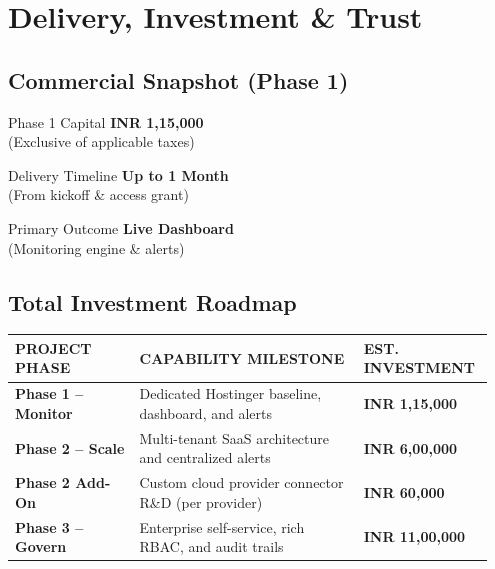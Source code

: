 \documentclass[11pt,a4paper]{article}
\newcommand{\thd}[1]{\textsc{\bfseries\color{white}\fontsize{8.6}{8.6}\selectfont #1}}
\begin{document}
\section{Delivery, Investment \& Trust}

\subsection{Commercial Snapshot (Phase 1)}
\vspace{0.5em}
\begin{center}
\begin{valuecard}{Phase 1 Capital}
\textbf{INR 1,15,000}\\[4pt]
\textcolor{softgray}{\fontsize{8}{10}\selectfont (Exclusive of applicable taxes)}
\end{valuecard}
\hfill
\begin{valuecard}{Delivery Timeline}
\textbf{Up to 1 Month}\\[4pt]
\textcolor{softgray}{\fontsize{8}{10}\selectfont (From kickoff \& access grant)}
\end{valuecard}
\hfill
\begin{valuecard}{Primary Outcome}
\textbf{Live Dashboard}\\[4pt]
\textcolor{softgray}{\fontsize{8}{10}\selectfont (Monitoring engine \& alerts)}
\end{valuecard}
\end{center}
\vspace{1.5em}

\subsection{Total Investment Roadmap}
\vspace{0.5em}
\renewcommand{\arraystretch}{1.7}
\begin{tabular}{@{}>{\raggedright\arraybackslash}p{0.25\linewidth}>{\raggedright\arraybackslash}p{0.45\linewidth}>{\raggedleft\arraybackslash}p{0.25\linewidth}@{}}
\rowcolor{navy}
\thd{PROJECT PHASE} & \thd{CAPABILITY MILESTONE} & \thd{EST. INVESTMENT} \\
\midrule
\textbf{Phase 1 -- Monitor} & Dedicated Hostinger baseline, dashboard, and alerts & \textbf{INR 1,15,000} \\
\rowcolor{tabletint}
\textbf{Phase 2 -- Scale} & Multi-tenant SaaS architecture and centralized alerts & \textbf{INR 6,00,000} \\
\textbf{Phase 2 Add-On} & Custom cloud provider connector R\&D (per provider) & \textbf{INR 60,000} \\
\rowcolor{tabletint}
\textbf{Phase 3 -- Govern} & Enterprise self-service, rich RBAC, and audit trails & \textbf{INR 11,00,000} \\
\bottomrule
\end{tabular}
\vspace{1.5em}
\end{document}
